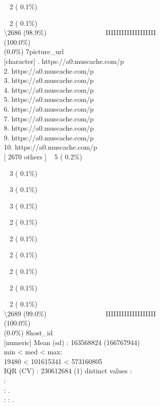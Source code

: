 \documentclass[
  journal,
]{IEEEtran}%
\begin{document}
\strut ~ 2 ( 0.1\%)\\
\strut ~ 2 ( 0.1\%)\\
\textbackslash2686 (98.9\%) \textbar{} \textbar~ ~ ~ ~ ~ ~ ~ ~ ~ ~
IIIIIIIIIIIIIIIIIII \\
(100.0\%) \\
(0.0\%) \textbar{} \textbar{} 7\textbar picture\_url\\
{[}character{]} . https://a0.muscache.com/p\\
2. https://a0.muscache.com/p\\
3. https://a0.muscache.com/p\\
4. https://a0.muscache.com/p\\
5. https://a0.muscache.com/p\\
6. https://a0.muscache.com/p\\
7. https://a0.muscache.com/p\\
8. https://a0.muscache.com/p\\
9. https://a0.muscache.com/p\\
10. https://a0.muscache.com/p\\
{[} 2670 others {]} \textbar~ 5 ( 0.2\%)\\
\strut ~ 3 ( 0.1\%)\\
\strut ~ 3 ( 0.1\%)\\
\strut ~ 3 ( 0.1\%)\\
\strut ~ 2 ( 0.1\%)\\
\strut ~ 2 ( 0.1\%)\\
\strut ~ 2 ( 0.1\%)\\
\strut ~ 2 ( 0.1\%)\\
\strut ~ 2 ( 0.1\%)\\
\strut ~ 2 ( 0.1\%)\\
\textbackslash2689 (99.0\%) \textbar{} \textbar~ ~ ~ ~ ~ ~ ~ ~ ~ ~
IIIIIIIIIIIIIIIIIII \\
(100.0\%) \\
(0.0\%) \textbar{} \textbar{} 8\textbar host\_id\\
{[}numeric{]} \textbar Mean (sd) : 163568824 (166767944)\\
min \textless{} med \textless{} max:\\
19480 \textless{} 101615341 \textless{} 573160805\\
IQR (CV) : 230612684 (1)  distinct values \textbar{}
\textbar:\\
:\\
: .\\
: : .\\
\end{document}
